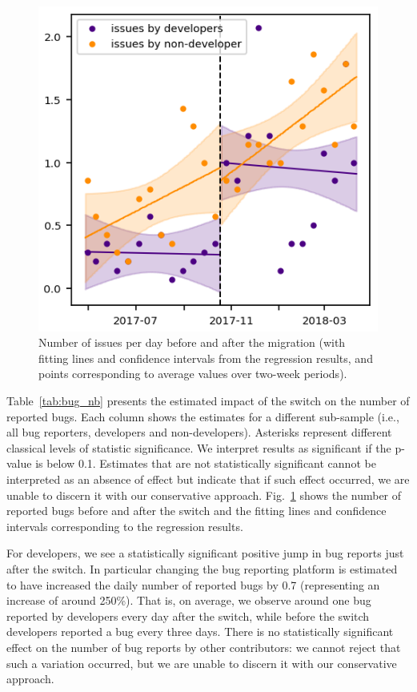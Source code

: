 \documentclass[conference]{IEEEtran}
\begin{document}
\begin{figure}
\includegraphics{bug_nb_rd.png}
\caption{Number of issues per day before and after the migration (with fitting lines and confidence intervals from the regression results, and points corresponding to average values over two-week periods).} \label{bug_nb_rd}
\end{figure}

Table~\ref{tab:bug_nb} presents the estimated impact of the switch on the number of reported bugs. Each column shows the estimates for a different sub-sample (i.e., all bug reporters, developers and non-developers). Asterisks represent different classical levels of statistic significance. We interpret results as significant if the p-value is below 0.1. Estimates that are not statistically significant cannot be interpreted as an absence of effect but indicate that if such effect occurred, we are unable to discern it with our conservative approach. Fig.~\ref{bug_nb_rd}  shows the number of reported bugs before and after the switch and the fitting lines and confidence intervals corresponding to the regression results. 

For developers, we see a statistically significant positive jump in bug reports just after the switch. In particular changing the bug reporting platform is estimated to have increased the daily number of reported bugs by 0.7 (representing an increase of around 250\%). That is, on average, we observe around one bug reported by developers every day after the switch, %
while before the switch developers reported a bug every three days. There is no statistically significant effect on the number of bug reports by other contributors: we cannot reject that such a variation occurred, but we are unable to discern it with our conservative approach.
\end{document}
